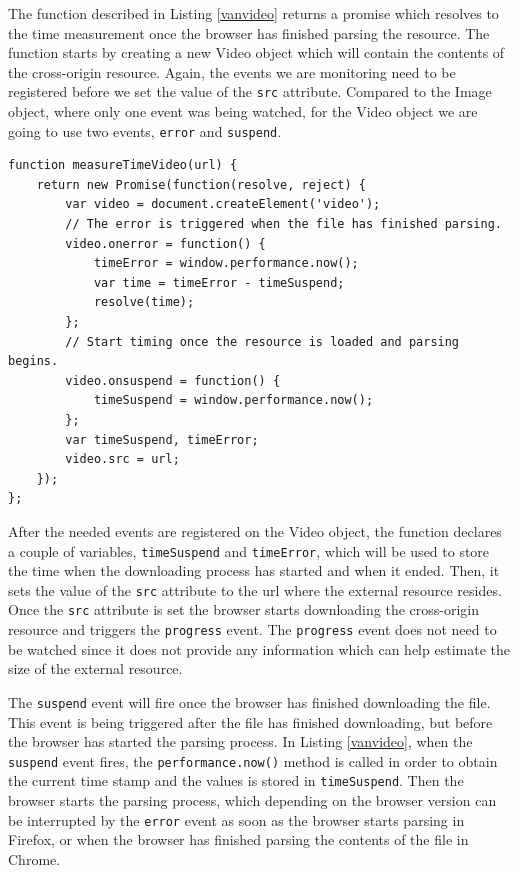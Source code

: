 \documentclass[10pt,a4paper,twoside]{book}
\begin{document}
The function described in Listing \ref{vanvideo} returns a promise which resolves to the time measurement once the browser has finished parsing the resource. The function starts  by creating a new Video object which will contain the contents of the cross-origin resource. Again, the events we are monitoring need to be registered before we set the value of the \texttt{src} attribute. Compared to the Image object, where only one event was being watched, for the Video object we are going to use two events, \texttt{error} and \texttt{suspend}.

\begin{lstlisting}[caption={Measuring the load time of an external resource as a Video},label={vanvideo}]
function measureTimeVideo(url) {
	return new Promise(function(resolve, reject) {
		var video = document.createElement('video');
        // The error is triggered when the file has finished parsing.
		video.onerror = function() {
			timeError = window.performance.now();
			var time = timeError - timeSuspend;
			resolve(time);
		};
		// Start timing once the resource is loaded and parsing begins.
		video.onsuspend = function() {
			timeSuspend = window.performance.now();
		};
		var timeSuspend, timeError;
		video.src = url;
	});
};
\end{lstlisting}

After the needed events are registered on the Video object, the function declares a couple of variables, \texttt{timeSuspend} and \texttt{timeError}, which will be used to store the time when the downloading process has started and when it ended. Then, it sets the value of the \texttt{src} attribute to the url where the external resource resides. Once the \texttt{src} attribute is set the browser starts downloading the cross-origin resource and triggers the \texttt{progress} event. The \texttt{progress} event does not need to be watched since it does not provide any information which can help estimate the size of the external resource. 

The \texttt{suspend} event will fire once the browser has finished downloading the file. This event is being triggered after the file has finished downloading, but before the browser has started the parsing process. In Listing \ref{vanvideo}, when the \texttt{suspend} event fires, the \texttt{performance.now()} method is called in order to obtain the current time stamp and the values is stored in \texttt{timeSuspend}. Then the browser starts the parsing process, which depending on the browser version can be interrupted by the \texttt{error} event as soon as the browser starts parsing in Firefox, or when the browser has finished parsing the contents of the file in Chrome. 
\end{document}
